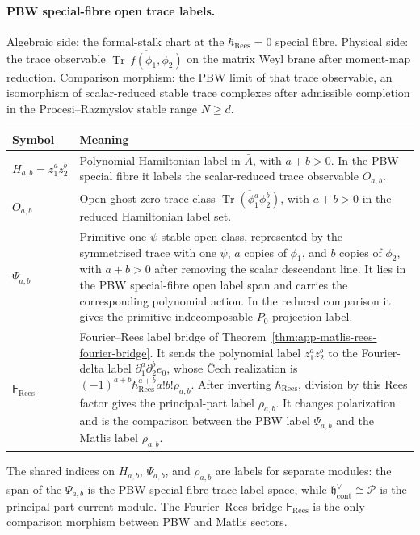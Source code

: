\paragraph{PBW special-fibre open trace labels.}
Algebraic side: the formal-stalk chart at the \(\hbar_{\mathrm{Rees}}=0\) special fibre.
Physical side: the trace observable
\(\overline{\operatorname{Tr}\,f(\phi_1,\phi_2)}\) on the matrix Weyl
brane after moment-map reduction.  Comparison morphism: the PBW limit
of that trace observable, an isomorphism of scalar-reduced stable trace
complexes after admissible completion in the Procesi--Razmyslov stable
range \(N\geq d\).
\begin{center}
\begin{tabular}{@{}>{\raggedright\arraybackslash}p{}
  >{\raggedright\arraybackslash}p{}@{}}
\hline
\textbf{Symbol} & \textbf{Meaning}\\
\hline
\(H_{a,b}=z_1^az_2^b\) &
Polynomial Hamiltonian label in \(\bar A\), with \(a+b>0\). In the
PBW special fibre it labels the scalar-reduced trace observable
\(O_{a,b}\).\\
\hline
\(O_{a,b}\) &
Open ghost-zero trace class
\(\overline{\operatorname{Tr}(\phi_1^a\phi_2^b)}\), with \(a+b>0\)
in the reduced Hamiltonian label set.\\
\hline
\(\Psi_{a,b}\) &
Primitive one-\(\psi\) stable open class, represented by the
symmetrised trace with one \(\psi\), \(a\) copies of \(\phi_1\), and
\(b\) copies of \(\phi_2\), with \(a+b>0\) after removing the scalar
descendant line. It lies in the PBW special-fibre open
label span and carries the corresponding polynomial action. In the reduced
comparison it gives the primitive indecomposable \(P_0\)-projection
label.\\
\hline
\(\mathsf F_{\mathrm{Rees}}\) &
Fourier--Rees label bridge of
Theorem~\ref{thm:app-matlis-rees-fourier-bridge}. It sends the
polynomial label \(z_1^az_2^b\) to the Fourier-delta label
\(\partial_1^a\partial_2^be_0\), whose \v{C}ech realization is
\((-1)^{a+b}\hbar_{\mathrm{Rees}}^{a+b}a!b!\rho_{a,b}\).  After inverting
\(\hbar_{\mathrm{Rees}}\), division by this Rees factor gives the
principal-part label \(\rho_{a,b}\).  It changes polarization and is
the comparison between the PBW label \(\Psi_{a,b}\) and the Matlis label
\(\rho_{a,b}\).\\
\hline
\end{tabular}
\end{center}

The shared indices on \(H_{a,b}\), \(\Psi_{a,b}\), and
\(\rho_{a,b}\) are labels for separate modules: the span of the
\(\Psi_{a,b}\) is the PBW special-fibre trace label space, while
\(\mathfrak h^\vee_{\mathrm{cont}}\cong\mathcal P\) is the
principal-part current module.  The Fourier--Rees bridge
\(\mathsf F_{\mathrm{Rees}}\) is the only comparison morphism between
PBW and Matlis sectors.

